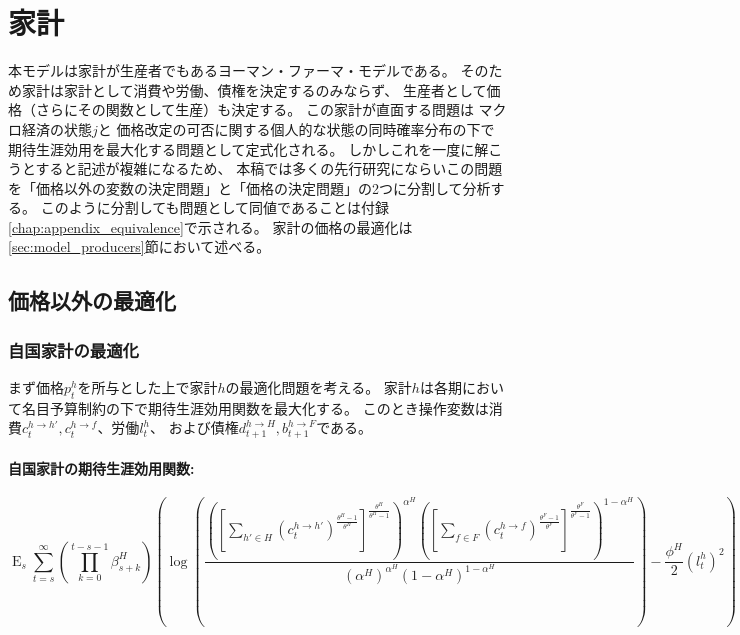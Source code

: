 
\section{家計}
\label{sec:model_households}
本モデルは家計が生産者でもあるヨーマン・ファーマ・モデルである。
そのため家計は家計として消費や労働、債権を決定するのみならず、
生産者として価格（さらにその関数として生産）も決定する。
この家計が直面する問題は
マクロ経済の状態\(j\)と
価格改定の可否に関する個人的な状態の同時確率分布の下で
期待生涯効用を最大化する問題として定式化される。
しかしこれを一度に解こうとすると記述が複雑になるため、
本稿では多くの先行研究にならいこの問題を「価格以外の変数の決定問題」と「価格の決定問題」の2つに分割して分析する。
このように分割しても問題として同値であることは付録\ref{chap:appendix_equivalence}で示される。
家計の価格の最適化は\ref{sec:model_producers}節において述べる。

\subsection{価格以外の最適化}
\label{sec:model_households_optimization}

\subsubsection{自国家計の最適化}
\label{sec:model_households_optimization_home}
まず価格\(p_t^h\)を所与とした上で家計\(h\)の最適化問題を考える。
家計\(h\)は各期において名目予算制約の下で期待生涯効用関数を最大化する。
このとき操作変数は消費\(c_t^{h\to h'},c_t^{h\to f}\)、労働\(l_t^h\)、
および債権\(d_{t+1}^{h\to H},b_{t+1}^{h\to F}\)である。

\paragraph{自国家計の期待生涯効用関数:}
\label{sec:model_households_optimization_home_utility}
\begin{equation}
\label{form:model_households_optimization_home_utility_function}
    \operatorname{E}_s\sum_{t=s}^{\infty}\left(\prod_{k=0}^{t-s-1}\beta_{s+k}^H\right)\left(\log\left(\frac{\left(\left[\sum_{h'\in H}(c_t^{h\to h'})^{\frac{\theta^H-1}{\theta^H}}\right]^{\frac{\theta^H}{\theta^H-1}}\right)^{\alpha^H}\left(\left[\sum_{f\in F}(c_t^{h\to f})^{\frac{\theta^F-1}{\theta^F}}\right]^{\frac{\theta^F}{\theta^F-1}}\right)^{1-\alpha^H}}{(\alpha^H)^{\alpha^H}(1-\alpha^H)^{1-\alpha^H}}\right)-\frac{\phi^H}{2}(l_t^h)^2\right)
\end{equation}

